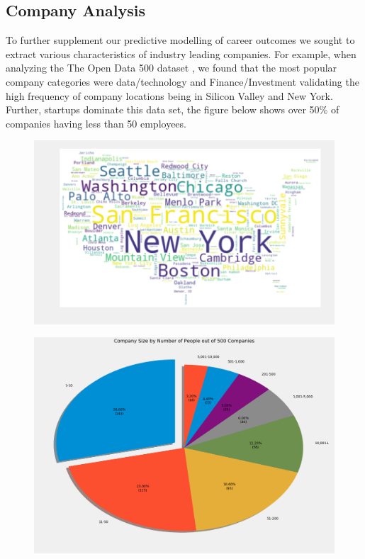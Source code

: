 \subsection{Company Analysis}
To further supplement our predictive modelling of career outcomes we sought to extract various characteristics of industry leading companies. For example, when analyzing the The Open Data 500 dataset \cite{kaggleCompanies}, we found that the most popular company categories were data/technology and Finance/Investment validating the high frequency of company locations being in Silicon Valley and New York. Further, startups dominate this data set, the figure below shows over 50\% of companies having less than 50 employees.
\begin{figure}
	\centering
	\begin{minipage}{.5\textwidth}
		\centering
		\includegraphics[width=.8\linewidth]{images/company_loc.png}
		\label{fig:test1}
	\end{minipage}%
	\begin{minipage}{.5\textwidth}
		\centering
		\includegraphics[width=.8\linewidth]{images/company_size.png}
		\label{fig:test2}
	\end{minipage}
\end{figure}

